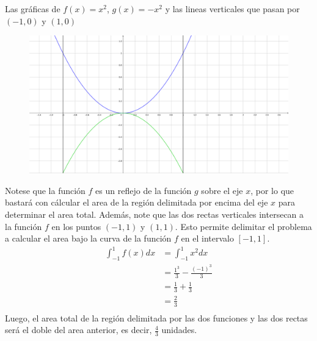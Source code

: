\documentclass[../../main.tex]{subfiles}
\begin{document}
\begin{partes}
    \parte Las gráficas de $f(x) = x^2$, $g(x) = -x^2$ y las lineas verticales que pasan por $(-1, 0)$ y $(1, 0)$\\
    \begin{figure}[h]
        \centering
        \includegraphics[width=12cm]{Parte 1/grafica2.png}
    \end{figure}
    Notese que la función $f$ es un reflejo de la función $g$ sobre el eje $x$, por lo que bastará con cálcular el area de la región delimitada por
    encima del eje $x$ para determinar el area total. Además, note que las dos rectas verticales intersecan a la función $f$ en los puntos $(-1, 1)$ y $(1, 1)$. Esto
    permite delimitar el problema a calcular el area bajo la curva de la función $f$ en el intervalo $[-1, 1]$.
    \begin{align*}
        \int_{-1}^1 f(x) dx &= \int_{-1}^1 x^2 dx\\
        &= \frac{1^3}{3} - \frac{(-1)^3}{3}\\
        &= \frac{1}{3} + \frac{1}{3}\\
        &= \frac{2}{3}\\
    \end{align*}
    Luego, el area total de la región delimitada por las dos funciones y las dos rectas será el doble del area anterior, es decir,
    $\frac{4}{3}$ unidades.


\end{partes}
\end{document}

